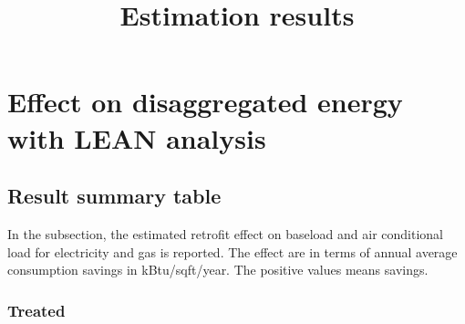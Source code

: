 \documentclass[12pt]{article}
\begin{document}
\title{Estimation results}
\maketitle
\tableofcontents
\newpage
\section{Effect on disaggregated energy with LEAN analysis}
\subsection{Result summary table}
In the subsection, the estimated retrofit effect on baseload and air conditional
load for electricity and gas is reported. The effect are in terms of annual average consumption
savings in kBtu/sqft/year. The positive values means savings.
\subsubsection{Treated}
















\end{document}
